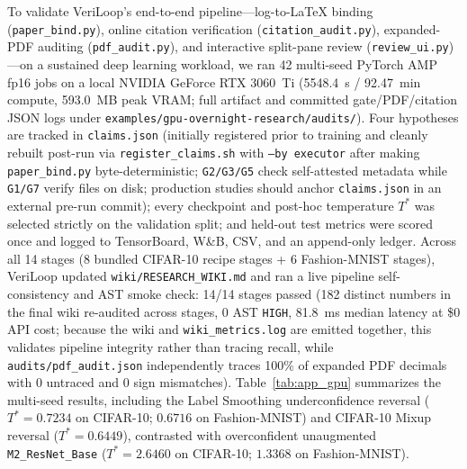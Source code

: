 To validate VeriLoop's end-to-end pipeline---log-to-\LaTeX{} binding (\texttt{paper\_bind.py}), online citation verification (\texttt{citation\_audit.py}), expanded-PDF auditing (\texttt{pdf\_audit.py}), and interactive split-pane review (\texttt{review\_ui.py})---on a sustained deep learning workload, we ran 42 multi-seed PyTorch AMP fp16 jobs on a local NVIDIA GeForce RTX 3060~Ti (5548.4~s / 92.47~min compute, 593.0~MB peak VRAM; full artifact and committed gate/PDF/citation JSON logs under \texttt{examples/gpu-overnight-research/audits/}).
Four hypotheses are tracked in \texttt{claims.json} (initially registered prior to training and cleanly rebuilt post-run via \texttt{register\_claims.sh} with \texttt{--by executor} after making \texttt{paper\_bind.py} byte-deterministic; \texttt{G2/G3/G5} check self-attested metadata while \texttt{G1/G7} verify files on disk; production studies should anchor \texttt{claims.json} in an external pre-run commit); every checkpoint and post-hoc temperature $T^*$ was selected strictly on the validation split; and held-out test metrics were scored once and logged to TensorBoard, W\&B, CSV, and an append-only ledger.
Across all 14 stages (8 bundled CIFAR-10 recipe stages + 6 Fashion-MNIST stages), VeriLoop updated \texttt{wiki/RESEARCH\_WIKI.md} and ran a live pipeline self-consistency and AST smoke check: 14/14 stages passed (182 distinct numbers in the final wiki re-audited across stages, 0 AST \texttt{HIGH}, 81.8~ms median latency at \$0 API cost; because the wiki and \texttt{wiki\_metrics.log} are emitted together, this validates pipeline integrity rather than tracing recall, while \texttt{audits/pdf\_audit.json} independently traces 100\% of expanded PDF decimals with 0 untraced and 0 sign mismatches).
Table~\ref{tab:app_gpu} summarizes the multi-seed results, including the Label Smoothing underconfidence reversal ($T^*=0.7234$ on CIFAR-10; $0.6716$ on Fashion-MNIST) and CIFAR-10 Mixup reversal ($T^*=0.6449$), contrasted with overconfident unaugmented \texttt{M2\_ResNet\_Base} ($T^*=2.6460$ on CIFAR-10; $1.3368$ on Fashion-MNIST).

